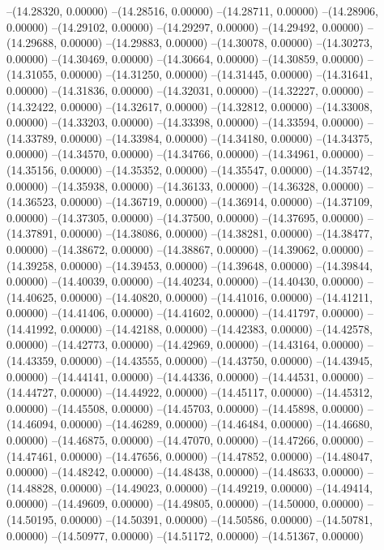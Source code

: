 --(14.28320, 0.00000)
--(14.28516, 0.00000)
--(14.28711, 0.00000)
--(14.28906, 0.00000)
--(14.29102, 0.00000)
--(14.29297, 0.00000)
--(14.29492, 0.00000)
--(14.29688, 0.00000)
--(14.29883, 0.00000)
--(14.30078, 0.00000)
--(14.30273, 0.00000)
--(14.30469, 0.00000)
--(14.30664, 0.00000)
--(14.30859, 0.00000)
--(14.31055, 0.00000)
--(14.31250, 0.00000)
--(14.31445, 0.00000)
--(14.31641, 0.00000)
--(14.31836, 0.00000)
--(14.32031, 0.00000)
--(14.32227, 0.00000)
--(14.32422, 0.00000)
--(14.32617, 0.00000)
--(14.32812, 0.00000)
--(14.33008, 0.00000)
--(14.33203, 0.00000)
--(14.33398, 0.00000)
--(14.33594, 0.00000)
--(14.33789, 0.00000)
--(14.33984, 0.00000)
--(14.34180, 0.00000)
--(14.34375, 0.00000)
--(14.34570, 0.00000)
--(14.34766, 0.00000)
--(14.34961, 0.00000)
--(14.35156, 0.00000)
--(14.35352, 0.00000)
--(14.35547, 0.00000)
--(14.35742, 0.00000)
--(14.35938, 0.00000)
--(14.36133, 0.00000)
--(14.36328, 0.00000)
--(14.36523, 0.00000)
--(14.36719, 0.00000)
--(14.36914, 0.00000)
--(14.37109, 0.00000)
--(14.37305, 0.00000)
--(14.37500, 0.00000)
--(14.37695, 0.00000)
--(14.37891, 0.00000)
--(14.38086, 0.00000)
--(14.38281, 0.00000)
--(14.38477, 0.00000)
--(14.38672, 0.00000)
--(14.38867, 0.00000)
--(14.39062, 0.00000)
--(14.39258, 0.00000)
--(14.39453, 0.00000)
--(14.39648, 0.00000)
--(14.39844, 0.00000)
--(14.40039, 0.00000)
--(14.40234, 0.00000)
--(14.40430, 0.00000)
--(14.40625, 0.00000)
--(14.40820, 0.00000)
--(14.41016, 0.00000)
--(14.41211, 0.00000)
--(14.41406, 0.00000)
--(14.41602, 0.00000)
--(14.41797, 0.00000)
--(14.41992, 0.00000)
--(14.42188, 0.00000)
--(14.42383, 0.00000)
--(14.42578, 0.00000)
--(14.42773, 0.00000)
--(14.42969, 0.00000)
--(14.43164, 0.00000)
--(14.43359, 0.00000)
--(14.43555, 0.00000)
--(14.43750, 0.00000)
--(14.43945, 0.00000)
--(14.44141, 0.00000)
--(14.44336, 0.00000)
--(14.44531, 0.00000)
--(14.44727, 0.00000)
--(14.44922, 0.00000)
--(14.45117, 0.00000)
--(14.45312, 0.00000)
--(14.45508, 0.00000)
--(14.45703, 0.00000)
--(14.45898, 0.00000)
--(14.46094, 0.00000)
--(14.46289, 0.00000)
--(14.46484, 0.00000)
--(14.46680, 0.00000)
--(14.46875, 0.00000)
--(14.47070, 0.00000)
--(14.47266, 0.00000)
--(14.47461, 0.00000)
--(14.47656, 0.00000)
--(14.47852, 0.00000)
--(14.48047, 0.00000)
--(14.48242, 0.00000)
--(14.48438, 0.00000)
--(14.48633, 0.00000)
--(14.48828, 0.00000)
--(14.49023, 0.00000)
--(14.49219, 0.00000)
--(14.49414, 0.00000)
--(14.49609, 0.00000)
--(14.49805, 0.00000)
--(14.50000, 0.00000)
--(14.50195, 0.00000)
--(14.50391, 0.00000)
--(14.50586, 0.00000)
--(14.50781, 0.00000)
--(14.50977, 0.00000)
--(14.51172, 0.00000)
--(14.51367, 0.00000)
